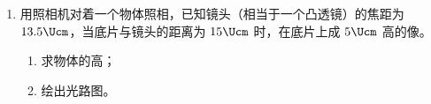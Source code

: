 \documentclass[\gkver]{gaokaozhenti}
\begin{document}
\begin{enumerate}
{$\frac{U_{1}}{R_{1}}=\frac{U_{2}}{R_{2}}$，解得 $\frac{U_{1}}{U_{2}}=\frac{R_{1}}{R_{2}}=\frac{2}{4}=\frac{1}{2}$。

（2）两个开关都接通时，$R_{2}$ 与 $R_{3}$ 并联，设并联电阻为 $R'$，则有

$R'=\frac{R_{2}R_{3}}{R_{2}+R_{3}}=\frac{4\times4}{4+4}=2\UO$，

$R'$ 与 $R_{1}$ 串联，由串联电路的分压原理得

$\frac{U_{1}'}{U_{2}'}=\frac{R_{1}}{R'}=\frac{2}{2}=1$。

（3）当两个开关都接通时，通过 $R_{1}$ 的电流，即干路电流，由闭合电路的欧姆定律得

$I=\frac{E}{R_{1}+R'+r}=\frac{4.2}{2+2+0.2}=1\UA$。

评分标准：全题 10 分，（1）3 分，（2）3 分，（3）4 分。

（1）中，直接写出 $\frac{U_{1}}{U_{2}}=\frac{R_{1}}{R_{2}}=\frac{2}{4}=\frac{1}{2}$ 的，同样给分。

（3）中，公式中漏了内阻 $r$ 的，不给分。
}

\item
用照相机对着一个物体照相，已知镜头（相当于一个凸透镜）的焦距为 $13.5\Ucm$，当底片与镜头的距离为 $15\Ucm$ 时，在底片上成 $5\Ucm$ 高的像。

\begin{enumerate}
	\item
	求物体的高；
	\item
	绘出光路图。
\end{enumerate}


\end{enumerate}
\end{document}
